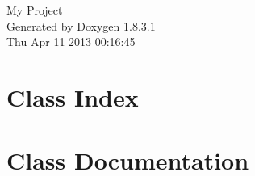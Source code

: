 \documentclass{book}
\begin{document}
\hypersetup{pageanchor=false,citecolor=blue}
\begin{titlepage}
\vspace*{7cm}
\begin{center}
{\Large My Project }\\
\vspace*{1cm}
{\large Generated by Doxygen 1.8.3.1}\\
\vspace*{0.5cm}
{\small Thu Apr 11 2013 00:16:45}\\
\end{center}
\end{titlepage}
\clearemptydoublepage
{}
\tableofcontents
\clearemptydoublepage
{}
\hypersetup{pageanchor=true,citecolor=blue}
\chapter{Class Index}

\chapter{Class Documentation}




































\printindex
\end{document}

